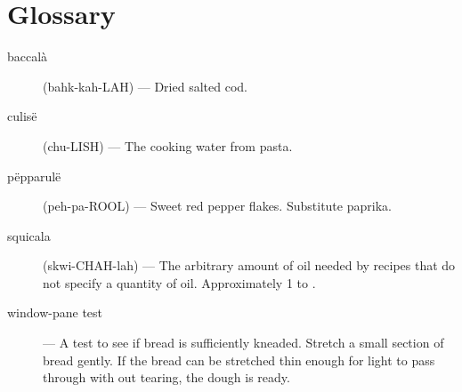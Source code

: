 \documentclass{book}
\begin{document}
\def\ThisFile{rcp:ToastingNuts}



\chapter{Glossary}
\begin{description}
\item[baccal\`a] (bahk-kah-LAH) --- Dried salted cod.
\item[culis\"e] (chu-LISH) --- The cooking water from pasta.
\item[p\"epparul\"e] (peh-pa-ROOL) --- Sweet red pepper flakes. Substitute paprika.
\item[squicala] (skwi-CHAH-lah) --- The arbitrary amount of oil needed by recipes that do not specify a quantity of oil. Approximately 1 to .
\item[window-pane test] --- A test to see if bread is sufficiently kneaded. Stretch a small section of bread gently. If the bread can be stretched thin enough for light to pass through with out tearing, the dough is ready.
\end{description}

\printindex
\end{document}
